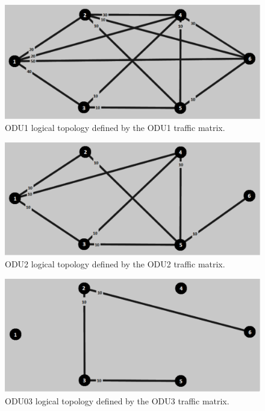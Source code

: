 \begin{figure}[H]
\centering
\includegraphics[width=13cm]{sdf/heuristic/opaque_protection/figures/logical_topology_odu1_medium}
\caption{ODU1 logical topology defined by the ODU1 traffic matrix.}
\label{logical_ODU1_protec_ref_medium_heuristic}
\end{figure}

\begin{figure}[H]
\centering
\includegraphics[width=13cm]{sdf/heuristic/opaque_protection/figures/logical_topology_odu2_medium}
\caption{ODU2 logical topology defined by the ODU2 traffic matrix.}
\label{logical_ODU2_protec_ref_medium_heuristic}
\end{figure}

\begin{figure}[H]
\centering
\includegraphics[width=13cm]{sdf/heuristic/opaque_protection/figures/logical_topology_odu3_medium}
\caption{ODU03 logical topology defined by the ODU3 traffic matrix.}
\label{logical_ODU3_protec_ref_medium_heuristic}
\end{figure}

